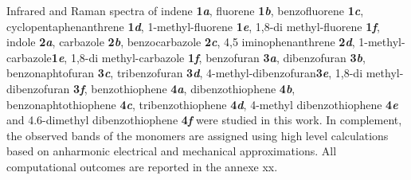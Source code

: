 Infrared and Raman spectra of  indene \textbf{1\textit{a}}, fluorene \textbf{1\textit{b}}, benzofluorene \textbf{1\textit{c}}, cyclopentaphenanthrene \textbf{1\textit{d}}, 1-methyl-fluorene \textbf{1\textit{e}}, 1,8-di methyl-fluorene \textbf{1\textit{f}},
indole \textbf{2\textit{a}}, carbazole \textbf{2\textit{b}}, benzocarbazole \textbf{2\textit{c}}, 4,5 iminophenanthrene \textbf{2\textit{d}}, 1-methyl-carbazole\textbf{1\textit{e}}, 1,8-di methyl-carbazole \textbf{1\textit{f}},
benzofuran \textbf{3\textit{a}}, dibenzofuran \textbf{3\textit{b}}, benzonaphtofuran \textbf{3\textit{c}}, tribenzofuran \textbf{3\textit{d}}, 4-methyl-dibenzofuran\textbf{3\textit{e}}, 1,8-di methyl-dibenzofuran \textbf{3\textit{f}},
benzothiophene \textbf{4\textit{a}}, dibenzothiophene \textbf{4\textit{b}}, benzonaphtothiophene \textbf{4\textit{c}}, tribenzothiophene \textbf{4\textit{d}}, 4-methyl dibenzothiophene \textbf{4\textit{e}} and 4.6-dimethyl dibenzothiophene \textbf{4\textit{f}} were studied in this work. In complement, the observed bands of the monomers are assigned using high level calculations based on anharmonic electrical and mechanical approximations. All computational outcomes are reported in the annexe xx.
	
